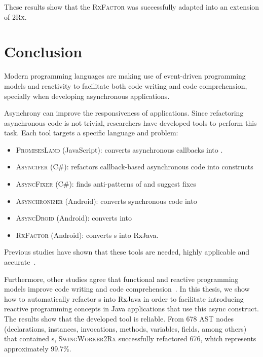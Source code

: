 \documentclass[type=bsc,accentcolor=tud9c]{tudthesis}
\newcommand{\framework}[1]{\textcolor{black}{#1}}
\newcommand{\toolcore}{\textsc{2Rx}}
\newcommand{\toolextension}{\textsc{SwingWorker2Rx}}
\begin{document}
These results show that the \textsc{RxFactor} was successfully adapted into an extension of \toolcore{}.





\chapter{Conclusion}
\label{chapter:conclusion}
Modern programming languages are making use of event-driven programming models and reactivity to facilitate both code writing and code comprehension, specially when developing asynchronous applications.

Asynchrony can improve the responsiveness of applications. Since refactoring asynchronous code is not trivial, researchers have developed tools to perform this task. Each tool targets a specific language and problem:

\begin{itemize}
	\item \textsc{PromisesLand} (JavaScript): converts asynchronous callbacks into .
	\item \textsc{Asyncifer} (C\#): refactors callback-based asynchronous code into  constructs
	\item \textsc{AsyncFixer} (C\#): finds anti-patterns of  and suggest fixes
	\item \textsc{Asynchronizer} (Android): converts synchronous code into 
	\item \textsc{AsyncDroid} (Android): converts  into 
	\item \textsc{RxFactor} (Android): converts s into \framework{RxJava}.
\end{itemize}

Previous studies have shown that these tools are needed, highly applicable and accurate~\cite{paperAsyncMobile, paperStudyRefactoring, thesisJavaScript}.

Furthermore, other studies agree that functional and reactive programming models improve code writing and code comprehension~\cite{promises, paperReactiveComprehension}. In this thesis, we show how to automatically refactor s into \framework{RxJava} in order to facilitate introducing reactive programming concepts in \framework{Java} applications that use this async construct. The results show that the developed tool is reliable. From 678 AST nodes (declarations, instances, invocations, methods, variables, fields, among others) that contained s, \toolextension{} successfully refactored 676, which represents approximately 99.7\%.
\end{document}
